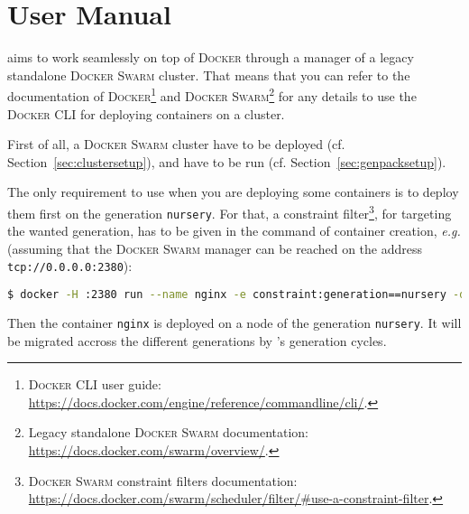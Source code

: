 
\chapter{User Manual}
\label{chap:usermanual}

\GP{} aims to work seamlessly on top of \textsc{Docker} through a manager of a legacy standalone \textsc{Docker Swarm} cluster.
That means that you can refer to the documentation of \textsc{Docker}\footnote{\textsc{Docker} CLI user guide: \url{https://docs.docker.com/engine/reference/commandline/cli/}.} and \textsc{Docker Swarm}\footnote{Legacy standalone \textsc{Docker Swarm} documentation: \url{https://docs.docker.com/swarm/overview/}.} for any details to use the \textsc{Docker} CLI for deploying containers on a cluster.

First of all, a \textsc{Docker Swarm} cluster have to be deployed (cf. Section~\ref{sec:clustersetup}), and \GP{} have to be run (cf. Section~\ref{sec:genpacksetup}).

The only requirement to use \GP{} when you are deploying some containers is to deploy them first on the generation \texttt{nursery}.
For that, a constraint filter\footnote{\textsc{Docker Swarm} constraint filters documentation: \url{https://docs.docker.com/swarm/scheduler/filter/\#use-a-constraint-filter}.}, for targeting the wanted generation, has to be given in the command of container creation, \textit{e.g.} (assuming that the \textsc{Docker Swarm} manager can be reached on the address \texttt{tcp://0.0.0.0:2380}):

\begin{lstlisting}[language=bash, basicstyle=\small]
$ docker -H :2380 run --name nginx -e constraint:generation==nursery -d nginx
\end{lstlisting}

Then the container \texttt{nginx} is deployed on a node of the generation \texttt{nursery}.
It will be migrated accross the different generations by \GP{}'s generation cycles.




\newpage



\newpage


